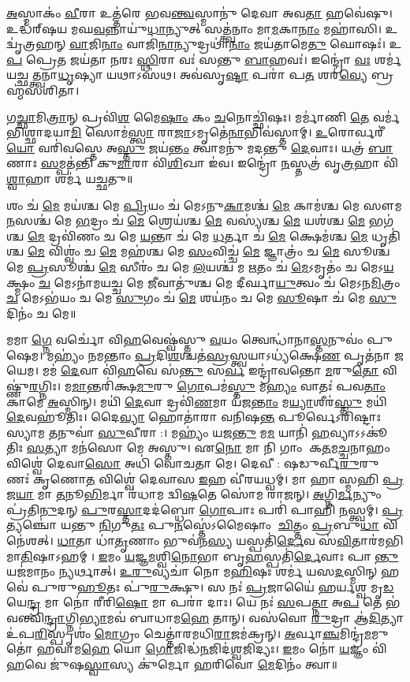 \ul{𑌅}𑌸𑍍𑌮𑌾𑌕𑌂॑ \ul{𑌵𑍀}𑌰𑌾 𑌉𑌤𑍍𑌤॑𑌰𑍇 𑌭𑌵\ul{𑌨𑍍𑌤𑍍𑌵}𑌸𑍍𑌮𑌾𑌨𑍁॑ 𑌦𑍇𑌵𑌾 𑌅𑌵\ul{𑌤𑌾} 𑌹𑌵𑍇॑𑌷𑍁। 𑌉𑌦𑍍𑌧॑𑌰𑍍‌𑌷𑌯 𑌮𑌘\ul{𑌵}𑌨𑍍𑌨𑌾𑌯𑍁॑\ul{𑌧𑌾}𑌨𑍍𑌯𑍁𑌤𑍍 𑌸𑌤𑍍𑌤𑍍𑌵॑𑌨𑌾𑌂 𑌮𑌾\ul{𑌮}𑌕𑌾\ul{𑌨𑌾𑌂} 𑌮𑌹𑌾॑𑌸𑌿। 𑌉𑌦𑍍𑌵𑍃॑𑌤𑍍𑌰𑌹𑌨𑍍 \ul{𑌵𑌾}𑌜𑌿\ul{𑌨𑌾𑌂} 𑌵𑌾𑌜𑌿॑\ul{𑌨𑌾}𑌨𑍍𑌯𑍁𑌦𑍍𑌰𑌥𑌾॑\ul{𑌨𑌾𑌂} 𑌜𑌯॑𑌤𑌾𑌮𑍇\ul{𑌤𑍁} 𑌘𑍋𑌷𑌃॑। 𑌉\ul{𑌪} 𑌪𑍍𑌰𑍇\ul{𑌤} 𑌜𑌯॑𑌤𑌾 𑌨𑌰𑌃 \ul{𑌸𑍍𑌥𑌿}𑌰𑌾 𑌵𑌃॑ 𑌸𑌨𑍍𑌤𑍁 \ul{𑌬𑌾}𑌹𑌵𑌃॑। 𑌇𑌨𑍍𑌦𑍍𑌰𑍋॑ \ul{𑌵𑌃} 𑌶𑌰𑍍𑌮॑ 𑌯𑌚𑍍𑌛𑌤𑍍𑌤𑍍𑌵𑌨𑌾\ul{𑌧𑍃}𑌷𑍍𑌯𑌾 𑌯𑌥𑌾𑌽𑌸॑𑌥। 𑌅𑌵॑𑌸𑍃\ul{𑌷𑍍𑌟𑌾} 𑌪𑌰𑌾॑ 𑌪\ul{𑌤} 𑌶𑌰॑\ul{𑌵𑍍𑌯𑍇} 𑌬𑍍𑌰𑌹𑍍𑌮॑𑌸𑌶𑌿𑌤𑌾।

𑌗\ul{𑌚𑍍𑌛𑌾}𑌮𑌿\ul{𑌤𑍍𑌰𑌾}𑌨𑍍 𑌪𑍍𑌰𑌵𑌿॑\ul{𑌶} 𑌮𑍈\ul{𑌷𑌾𑌂} 𑌕𑌂 \ul{𑌚}𑌨𑍋𑌚𑍍𑌛𑌿॑𑌷𑌃। 𑌮𑌰𑍍𑌮𑌾॑𑌣𑌿 \ul{𑌤𑍇} 𑌵𑌰𑍍𑌮॑𑌭𑌿𑌶𑍍𑌛𑌾𑌦𑌯𑌾\ul{𑌮𑌿} 𑌸𑍋𑌮॑\ul{𑌸𑍍𑌤𑍍𑌵𑌾} 𑌰𑌾\ul{𑌜𑌾}𑌽𑌮𑍃𑌤𑍇॑\ul{𑌨𑌾}𑌭𑌿𑌵॑𑌸𑍍𑌤𑌾𑌮𑍍। \ul{𑌉}𑌰𑍋𑌰𑍍𑌵𑌰𑍀॑\ul{𑌯𑍋} 𑌵𑌰𑌿॑𑌵𑌸𑍍𑌤𑍇 𑌅\ul{𑌸𑍍𑌤𑍁} 𑌜𑌯॑\ul{𑌨𑍍𑌤𑌂} 𑌤𑍍𑌵𑌾𑌮𑌨𑍁॑ 𑌮𑌦𑌨𑍍𑌤𑍁 \ul{𑌦𑍇}𑌵𑌾𑌃। 𑌯𑌤𑍍𑌰॑ \ul{𑌬𑌾}𑌣𑌾𑌃 \ul{𑌸}𑌮𑍍𑌪𑌤॑𑌨𑍍𑌤𑌿 𑌕𑍁\ul{𑌮𑌾}𑌰𑌾 𑌵𑌿॑\ul{𑌶𑌿}𑌖𑌾 𑌇॑𑌵। 𑌇𑌨𑍍𑌦𑍍𑌰𑍋॑ \ul{𑌨}𑌸𑍍𑌤𑌤𑍍𑌰॑ 𑌵𑍃\ul{𑌤𑍍𑌰}𑌹𑌾 𑌵𑌿॑\ul{𑌶𑍍𑌵𑌾}𑌹𑌾 𑌶𑌰𑍍𑌮॑ 𑌯𑌚𑍍𑌛𑌤𑍁॥

𑌶𑌂 𑌚॑ \ul{𑌮𑍇} 𑌮𑌯॑𑌶𑍍𑌚 𑌮𑍇 \ul{𑌪𑍍𑌰𑌿}𑌯𑌂 𑌚॑ 𑌮𑍇𑌽𑌨𑍁\ul{𑌕𑌾}𑌮𑌶𑍍𑌚॑ \ul{𑌮𑍇} 𑌕𑌾𑌮॑𑌶𑍍𑌚 𑌮𑍇 𑌸𑍗𑌮\ul{𑌨}𑌸𑌶𑍍𑌚॑ 𑌮𑍇 \ul{𑌭}𑌦𑍍𑌰𑌂 𑌚॑ \ul{𑌮𑍇} 𑌶𑍍𑌰𑍇𑌯॑𑌶𑍍𑌚 \ul{𑌮𑍇} 𑌵𑌸𑍍𑌯॑𑌶𑍍𑌚 \ul{𑌮𑍇} 𑌯𑌶॑𑌶𑍍𑌚 \ul{𑌮𑍇} 𑌭𑌗॑𑌶𑍍𑌚 \ul{𑌮𑍇} 𑌦𑍍𑌰𑌵𑌿॑𑌣𑌂 𑌚 𑌮𑍇 \ul{𑌯}𑌨𑍍𑌤𑌾 𑌚॑ 𑌮𑍇 \ul{𑌧}𑌰𑍍𑌤𑌾 𑌚॑ \ul{𑌮𑍇} 𑌕𑍍𑌷𑍇𑌮॑𑌶𑍍𑌚 \ul{𑌮𑍇} 𑌧𑍃𑌤𑌿॑𑌶𑍍𑌚 \ul{𑌮𑍇} 𑌵𑌿𑌶𑍍𑌵𑌂॑ 𑌚 \ul{𑌮𑍇} 𑌮𑌹॑𑌶𑍍𑌚 𑌮𑍇 \ul{𑌸𑌂}𑌵𑌿𑌚𑍍𑌚॑ \ul{𑌮𑍇} 𑌜𑍍𑌞𑌾𑌤𑍍𑌰𑌂॑ 𑌚 \ul{𑌮𑍇} 𑌸𑍂𑌶𑍍𑌚॑ 𑌮𑍇 \ul{𑌪𑍍𑌰}𑌸𑍂𑌶𑍍𑌚॑ \ul{𑌮𑍇} 𑌸𑍀𑌰𑌂॑ 𑌚 𑌮𑍇 \ul{𑌲}𑌯𑌶𑍍𑌚॑ 𑌮 \ul{𑌋}𑌤𑌂 𑌚॑ \ul{𑌮𑍇}𑌽𑌮𑍃𑌤𑌂॑ 𑌚 𑌮𑍇𑌽\ul{𑌯}𑌕𑍍𑌷𑍍𑌮𑌂 \ul{𑌚} 𑌮𑍇𑌽𑌨𑌾॑𑌮𑌯𑌚𑍍𑌚 𑌮𑍇 \ul{𑌜𑍀}𑌵𑌾𑌤𑍁॑𑌶𑍍𑌚 𑌮𑍇 𑌦𑍀𑌰𑍍𑌘𑌾\ul{𑌯𑍁}𑌤𑍍𑌵𑌂 𑌚॑ 𑌮𑍇𑌽𑌨\ul{𑌮𑌿}𑌤𑍍𑌰𑌂 \ul{𑌚} 𑌮𑍇𑌽𑌭॑𑌯𑌂 𑌚 𑌮𑍇 \ul{𑌸𑍁}𑌗𑌂 𑌚॑ \ul{𑌮𑍇} 𑌶𑌯॑𑌨𑌂 𑌚 𑌮𑍇 \ul{𑌸𑍂}𑌷𑌾 𑌚॑ 𑌮𑍇 \ul{𑌸𑍁}𑌦𑌿𑌨𑌂॑ 𑌚 𑌮𑍇॥

𑌮𑌮𑌾\ul{𑌗𑍍𑌨𑍇} 𑌵𑌰𑍍𑌚𑍋॑ 𑌵𑌿\ul{𑌹}𑌵𑍇𑌷𑍍𑌵॑𑌸𑍍𑌤𑍁 \ul{𑌵}𑌯𑌂 𑌤𑍍𑌵𑍇𑌨𑍍𑌧𑌾॑𑌨𑌾\ul{𑌸𑍍𑌤}𑌨𑍁𑌵𑌂॑ 𑌪𑍁𑌷𑍇𑌮। 𑌮𑌹𑍍𑌯𑌂॑ 𑌨𑌮𑌨𑍍𑌤𑌾𑌂 \ul{𑌪𑍍𑌰}𑌦𑌿\ul{𑌶}𑌶𑍍𑌚𑌤॑\ul{𑌸𑍍𑌰}𑌸𑍍𑌤𑍍𑌵𑌯𑌾𑌽𑌧𑍍𑌯॑𑌕𑍍𑌷𑍇\ul{𑌣} 𑌪𑍃𑌤॑𑌨𑌾 𑌜𑌯𑍇𑌮। 𑌮𑌮॑ \ul{𑌦𑍇}𑌵𑌾 𑌵𑌿॑\ul{𑌹}𑌵𑍇 𑌸॑\ul{𑌨𑍍𑌤𑍁} 𑌸\ul{𑌰𑍍𑌵} 𑌇𑌨𑍍𑌦𑍍𑌰𑌾॑𑌵𑌨𑍍𑌤𑍋 \ul{𑌮}𑌰𑍁\ul{𑌤𑍋} 𑌵𑌿𑌷𑍍𑌣𑍁॑\ul{𑌰}𑌗𑍍𑌨𑌿𑌃। 𑌮\ul{𑌮𑌾}𑌨𑍍𑌤𑌰𑌿॑𑌕𑍍𑌷\ul{𑌮𑍁}𑌰𑍁 \ul{𑌗𑍋}𑌪𑌮॑\ul{𑌸𑍍𑌤𑍁} 𑌮\ul{𑌹𑍍𑌯𑌂} 𑌵𑌾𑌤𑌃॑ 𑌪𑌵\ul{𑌤𑌾𑌂} 𑌕𑌾𑌮𑍇॑ \ul{𑌅}𑌸𑍍𑌮𑌿𑌨𑍍। 𑌮𑌯𑌿॑ \ul{𑌦𑍇}𑌵𑌾 𑌦𑍍𑌰𑌵𑌿॑\ul{𑌣}𑌮𑌾 𑌯॑𑌜\ul{𑌨𑍍𑌤𑌾𑌂} 𑌮\ul{𑌯𑍍𑌯𑌾}𑌶𑍀𑌰॑\ul{𑌸𑍍𑌤𑍁} 𑌮𑌯𑌿॑ \ul{𑌦𑍇}𑌵𑌹𑍂॑𑌤𑌿𑌃। 𑌦𑍈\ul{𑌵𑍍𑌯𑌾} 𑌹𑍋𑌤𑌾॑𑌰𑌾 𑌵𑌨𑌿𑌷\ul{𑌨𑍍𑌤} 𑌪𑍂𑌰𑍍𑌵𑍇𑌽𑌰𑌿॑𑌷𑍍𑌟𑌾𑌃 𑌸𑍍𑌯𑌾𑌮 \ul{𑌤}𑌨𑍁𑌵𑌾॑ \ul{𑌸𑍁}𑌵𑍀𑌰𑌾:। 𑌮𑌹𑍍𑌯𑌂॑ 𑌯𑌜\ul{𑌨𑍍𑌤𑍁} 𑌮\ul{𑌮} 𑌯𑌾𑌨𑌿॑ \ul{𑌹}𑌵𑍍𑌯𑌾𑌽𑌽𑌕𑍂॑𑌤𑌿𑌃 \ul{𑌸}𑌤𑍍𑌯𑌾 𑌮𑌨॑𑌸𑍋 𑌮𑍇 𑌅𑌸𑍍𑌤𑍁। 𑌏\ul{𑌨𑍋} 𑌮𑌾 𑌨𑌿 𑌗𑌾𑌂 𑌕\ul{𑌤}𑌮\ul{𑌚𑍍𑌚}𑌨𑌾𑌹𑌂 𑌵𑌿𑌶𑍍𑌵𑍇॑ 𑌦𑍇𑌵𑌾\ul{𑌸𑍋} 𑌅𑌧𑌿॑ 𑌵𑍋𑌚𑌤𑌾 𑌮𑍇। 𑌦𑍇𑌵𑍀: 𑌷𑌡𑍁𑌰𑍍𑌵𑍀\ul{𑌰𑍁}𑌰𑍁 𑌣𑌃॑ 𑌕𑍃𑌣𑍋\ul{𑌤} 𑌵𑌿𑌶𑍍𑌵𑍇॑ 𑌦𑍇𑌵𑌾𑌸 \ul{𑌇}𑌹 𑌵𑍀॑𑌰𑌯𑌧𑍍𑌵𑌮𑍍। 𑌮𑌾 𑌹𑌾𑌸𑍍𑌮𑌹𑌿 \ul{𑌪𑍍𑌰}𑌜\ul{𑌯𑌾} 𑌮𑌾 \ul{𑌤}𑌨𑍂\ul{𑌭𑌿}𑌰𑍍𑌮𑌾 𑌰॑𑌧𑌾𑌮 𑌦𑍍𑌵𑌿\ul{𑌷}𑌤𑍇 𑌸𑍋॑𑌮 𑌰𑌾𑌜𑌨𑍍। \ul{𑌅}𑌗𑍍𑌨𑌿\ul{𑌰𑍍𑌮}𑌨𑍍𑌯𑍁𑌂 𑌪𑍍𑌰॑𑌤𑌿\ul{𑌨𑍁}𑌦𑌨𑍍 \ul{𑌪𑍁}𑌰\ul{𑌸𑍍𑌤𑌾}𑌦𑌦॑𑌬𑍍𑌧𑍋 \ul{𑌗𑍋}𑌪𑌾𑌃 𑌪𑌰𑌿॑ 𑌪𑌾𑌹𑌿 \ul{𑌨}𑌸𑍍𑌤𑍍𑌵𑌮𑍍। \ul{𑌪𑍍𑌰}𑌤𑍍𑌯𑌞𑍍𑌚𑍋॑ 𑌯𑌨𑍍𑌤𑍁 \ul{𑌨𑌿}𑌗𑍁\ul{𑌤𑌃} 𑌪𑍁\ul{𑌨}𑌸𑍍𑌤𑍇॑𑌽𑌮𑍈𑌷𑌾𑌂 \ul{𑌚𑌿}𑌤𑍍𑌤𑌂 \ul{𑌪𑍍𑌰}𑌬𑍁\ul{𑌧𑌾} 𑌵𑌿 𑌨𑍇॑𑌶𑌤𑍍। \ul{𑌧𑌾}𑌤𑌾 𑌧𑌾॑\ul{𑌤𑍃}𑌣𑌾𑌂 𑌭𑍁𑌵॑𑌨\ul{𑌸𑍍𑌯} 𑌯𑌸𑍍𑌪𑌤𑌿॑\ul{𑌰𑍍𑌦𑍇}𑌵 𑌸॑\ul{𑌵𑌿}𑌤𑌾𑌰॑𑌮𑌭𑌿𑌮𑌾\ul{𑌤𑌿}𑌷𑌾𑌽𑌹𑌮𑍍। \ul{𑌇}𑌮𑌂 \ul{𑌯}𑌜𑍍𑌞\ul{𑌮}𑌶𑍍𑌵𑌿\ul{𑌨𑍋}𑌭𑌾 𑌬𑍃\ul{𑌹}𑌸𑍍𑌪𑌤𑌿॑\ul{𑌰𑍍𑌦𑍇}𑌵𑌾𑌃 𑌪𑌾\ul{𑌨𑍍𑌤𑍁} 𑌯𑌜॑𑌮𑌾𑌨𑌂 \ul{𑌨𑍍𑌯}𑌰𑍍𑌥𑌾𑌤𑍍। \ul{𑌉}\ul{𑌰𑍁}𑌵𑍍𑌯𑌚𑌾॑ 𑌨𑍋 𑌮\ul{𑌹𑌿}𑌷𑌃 𑌶𑌰𑍍𑌮॑ 𑌯𑌸\ul{𑌦}𑌸𑍍𑌮𑌿𑌨𑍍 𑌹𑌵𑍇॑ 𑌪𑍁𑌰𑍁\ul{𑌹𑍂}𑌤𑌃 𑌪𑍁॑\ul{𑌰𑍁}𑌕𑍍𑌷𑍁। 𑌸 𑌨𑌃॑ \ul{𑌪𑍍𑌰}𑌜𑌾𑌯𑍈॑ 𑌹𑌰𑍍𑌯𑌶𑍍𑌵 𑌮𑍃\ul{𑌡}𑌯𑍇\ul{𑌨𑍍𑌦𑍍𑌰} 𑌮𑌾 𑌨𑍋॑ 𑌰𑍀𑌰𑌿\ul{𑌷𑍋} 𑌮𑌾 𑌪𑌰𑌾॑ 𑌦𑌾𑌃। 𑌯𑍇 𑌨𑌃॑ \ul{𑌸}𑌪\ul{𑌤𑍍𑌨𑌾} 𑌅\ul{𑌪} 𑌤𑍇 𑌭॑𑌵𑌨𑍍𑌤𑍍𑌵𑌿\ul{𑌨𑍍𑌦𑍍𑌰𑌾}𑌗𑍍𑌨𑌿\ul{𑌭𑍍𑌯𑌾}𑌮𑌵॑ 𑌬𑌾𑌧𑌾𑌮\ul{𑌹𑍇} 𑌤𑌾𑌨𑍍। 𑌵𑌸॑𑌵𑍋 \ul{𑌰𑍁}𑌦𑍍𑌰𑌾 𑌆॑\ul{𑌦𑌿}𑌤𑍍𑌯𑌾 𑌉॑𑌪\ul{𑌰𑌿}𑌸𑍍𑌪𑍃𑌶𑌂॑ \ul{𑌮𑍋}𑌗𑍍𑌰𑌂 𑌚𑍇𑌤𑍍𑌤𑌾॑𑌰𑌮𑌧𑌿\ul{𑌰𑌾}𑌜𑌮॑𑌕𑍍𑌰𑌨𑍍। \ul{𑌅}𑌰𑍍𑌵𑌾\ul{𑌞𑍍𑌚}𑌮𑌿𑌨𑍍𑌦𑍍𑌰॑\ul{𑌮}𑌮𑍁𑌤𑍋॑ 𑌹𑌵𑌾𑌮\ul{𑌹𑍇} 𑌯𑍋 \ul{𑌗𑍋}𑌜𑌿𑌦𑍍𑌧॑\ul{𑌨}𑌜𑌿𑌦॑\ul{𑌶𑍍𑌵}𑌜𑌿𑌦𑍍𑌯𑌃। \ul{𑌇}𑌮𑌂 𑌨𑍋॑ \ul{𑌯}𑌜𑍍𑌞𑌂 𑌵𑌿॑\ul{𑌹}𑌵𑍇 𑌜𑍁॑𑌷\ul{𑌸𑍍𑌵𑌾}𑌸𑍍𑌯 𑌕𑍁॑𑌰𑍍𑌮𑍋 𑌹𑌰𑌿𑌵𑍋 \ul{𑌮𑍇}𑌦𑌿𑌨𑌂॑ 𑌤𑍍𑌵𑌾॥

